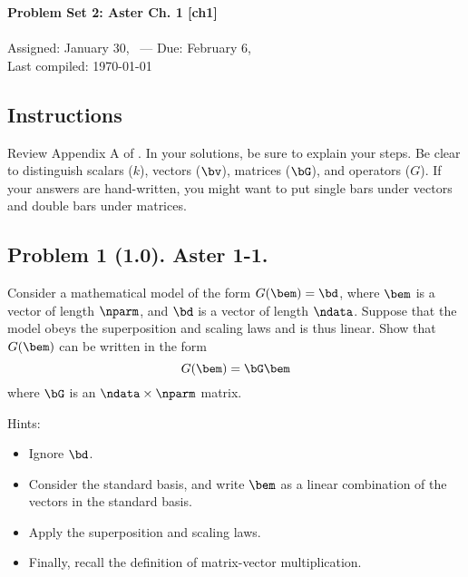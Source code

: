 \documentclass[11pt,titlepage,fleqn]{article}
\begin{document}

\begin{spacing}{1.2}
\centering
{\large \bf Problem Set 2: Aster Ch. 1 [ch1]} \\
\cltag\ \\
Assigned: January 30, \cyear\ --- Due: February 6, \cyear\ \\
Last compiled: \today
\end{spacing}


\subsection*{Instructions}

Review Appendix A of \citet{Aster}. In your solutions, be sure to explain your steps. Be clear to distinguish scalars ($k$), vectors ($\bv$), matrices ($\bG$), and operators ($G$). If your answers are hand-written, you might want to put single bars under vectors and double bars under matrices.

\subsection*{Problem 1 (1.0). Aster 1-1.}

Consider a mathematical model of the form $G(\bem) = \bd$, where $\bem$ is a vector of length $\nparm$, and $\bd$ is a vector of length $\ndata$. Suppose that the model obeys the superposition and scaling laws and is thus linear. Show that $G(\bem)$ can be written in the form
%
\begin{equation}
G(\bem) = \bG\bem
\end{equation}
%
where $\bG$ is an $\ndata \times \nparm$ matrix.

\medskip\noindent
Hints:
%
\begin{itemize}
\item Ignore $\bd$.
\item Consider the standard basis, and write $\bem$ as a linear combination of the vectors in the standard basis.
\item Apply the superposition and scaling laws.
\item Finally, recall the definition of matrix-vector multiplication.
\end{itemize}

\end{document}
